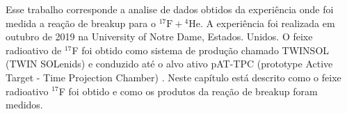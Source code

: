 \documentclass[a4paper,12pt,oneside]{book}
\begin{document}

\par Esse trabalho corresponde a analise de dados obtidos da experiência onde foi medida a reação de breakup para o ${}^{17}\mathrm{F}+{}^{4}\mathrm{He}$. A experiência foi realizada em outubro de 2019 na University of Notre Dame, Estados. Unidos. O feixe radioativo de $^{17}$F foi obtido como sistema de produção chamado TWINSOL (TWIN SOLenids) \cite{twinsol} e conduzido até o alvo ativo pAT-TPC (prototype Active Target - Time Projection Chamber) \cite{pattpc}. Neste capítulo está descrito como o feixe radioativo ${}^{17}$F foi obtido e como os produtos da reação de breakup foram medidos.





\end{document}
